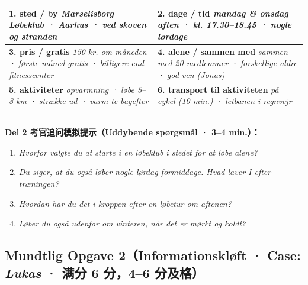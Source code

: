 \begin{tcolorbox}[enhanced, breakable, colback=NCDBgTeal, colframe=NCDTeal, coltitle=white, fonttitle=\bfseries, title={Mindmap 2B：Min fritidsaktivitet: Løbeklub / Fitness（官方六大分支 · 仅限 Stikord）}, arc=3pt, boxrule=0.8pt, left=10pt, right=10pt, top=7pt, bottom=7pt]
\small
\renewcommand{\arraystretch}{1.35}
\begin{tabularx}{\linewidth}{@{} >{\raggedright\arraybackslash}p{8.0cm} >{\raggedright\arraybackslash}X @{}}
\textbf{\color{NCDTeal}1. sted / by}\newline
\textit{Marselisborg Løbeklub · Aarhus · ved skoven og stranden}
&
\textbf{\color{NCDTeal}2. dage / tid}\newline
\textit{mandag \& onsdag aften · kl. 17.30--18.45 · nogle lørdage}
\\
\midrule
\textbf{\color{NCDTeal}3. pris / gratis}\newline
\textit{150 kr. om måneden · første måned gratis · billigere end fitnesscenter}
&
\textbf{\color{NCDTeal}4. alene / sammen med}\newline
\textit{sammen med 20 medlemmer · forskellige aldre · god ven (Jonas)}
\\
\midrule
\textbf{\color{NCDTeal}5. aktiviteter}\newline
\textit{opvarmning · løbe 5--8 km · strække ud · varm te bagefter}
&
\textbf{\color{NCDTeal}6. transport til aktiviteten}\newline
\textit{på cykel (10 min.) · letbanen i regnvejr}
\\
\end{tabularx}
\vspace{0.4em}
\hrule
\vspace{0.4em}
\textbf{\color{NCDRed}Del 2 考官追问模拟提示（Uddybende spørgsmål · 3--4 min.）：}
\begin{enumerate}
  \item \textit{Hvorfor valgte du at starte i en løbeklub i stedet for at løbe alene?}
  \item \textit{Du siger, at du også løber nogle lørdag formiddage. Hvad laver I efter træningen?}
  \item \textit{Hvordan har du det i kroppen efter en løbetur om aftenen?}
  \item \textit{Løber du også udenfor om vinteren, når det er mørkt og koldt?}
\end{enumerate}
\end{tcolorbox}

\subsection*{Mundtlig Opgave 2（Informationskløft · Case: \textit{Lukas} · 满分 6 分，4--6 分及格）}


